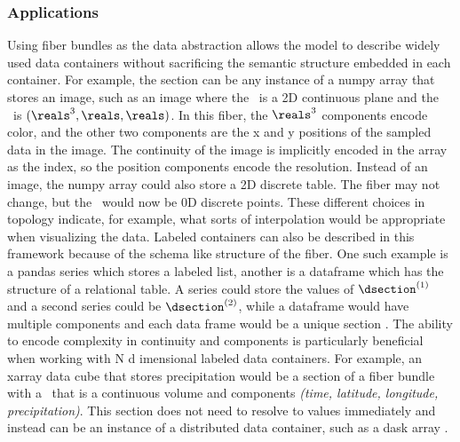 \documentclass[../main.tex]{subfiles}
\begin{document}
\subsubsection{Applications}
Using fiber bundles as the data abstraction allows the model to describe widely used data containers without sacrificing the semantic structure embedded in each container. For example, the section can be any instance of a numpy array \cite{harris2020array} that stores an image, such as an image where the \dbase\ is a 2D continuous plane and the \dfiber\ is \((\reals^{3}, \reals, \reals)\). In this fiber, the \(\reals^3\) components encode color, and the other two components are the x and y positions of the sampled data in the image. The continuity of the image is implicitly encoded in the array as the index, so the position components encode the resolution. Instead of an image, the numpy array could also store a 2D discrete table. The fiber may not change, but the \dbase\ would now be 0D discrete points. These different choices in topology indicate, for example, what sorts of interpolation would be appropriate when visualizing the data. 
Labeled containers can also be described in this framework because of the schema like structure of the fiber. One such example is a pandas series which stores a labeled list, another is a  dataframe \cite{jeff_reback_2020_3715232} which has the structure of a relational table. A series could store the values of \(\dsection^{(1)}\) and a second series could be  \(\dsection^{(2)}\), while a dataframe would have multiple components and each data frame would be a unique section \dsection. The ability to encode complexity in continuity and components is particularly beneficial when working with  N d imensional labeled data containers. For example, an xarray \cite{hoyer2017xarray} data cube that stores precipitation would be a section of a fiber bundle with a \dbase\ that is a continuous volume and components \textit{(time, latitude, longitude, precipitation)}. This section does not need to resolve to values immediately and instead can be an instance of a distributed data container, such as a dask array \cite{rocklinDaskParallelComputation2015}. 
\end{document}
